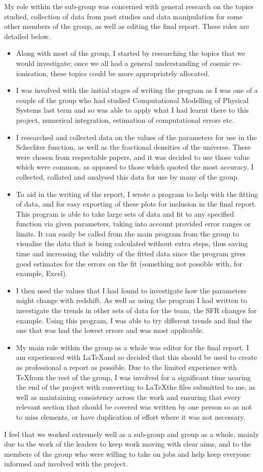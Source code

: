 My role within the sub-group was concerned with general research on the topics studied, collection of data from past studies and data manipulation for some other members of the group, as well as editing the final report. These roles are detailed below.
\begin{itemize}
	\item Along with most of the group, I started by researching the topics that we would investigate; once we all had a general understanding of cosmic re-ionisation, these topics could be more appropriately allocated.
	\item I was involved with the initial stages of writing the program as I was one of a couple of the group who had studied Computational Modelling of Physical Systems last term and so was able to apply what I had learnt there to this project, numerical integration, estimation of computational errors etc.
	\item I researched and collected data on the values of the parameters for use in the Schechter function, as well as the fractional densities of the universe. These were chosen from respectable papers, and it was decided to use those value which were common, as opposed to those which quoted the most accuracy. I collected, collated and analysed this data for use by many of the group.
	\item To aid in the writing of the report, I wrote a program to help with the fitting of data, and for easy exporting of these plots for inclusion in the final report. This program is able to take large sets of data and fit to any specified function via given parameters, taking into account provided error ranges or limits. It can easily be called from the main program from the group to visualise the data that is being calculated without extra steps, thus saving time and increasing the validity of the fitted data since the program gives good estimates for the errors on the fit (something not possible with, for example, Excel).
	\item I then used the values that I had found to investigate how the parameters might change with redshift. As well as using the program I had written to investigate the trends in other sets of data for the team, the SFR changes for example. Using this program, I was able to try different trends and find the one that was had the lowest errors and was most applicable.
	\item My main role within the group as a whole was editor for the final report. I am experienced with \LaTeX and so decided that this should be used to create as professional a report as possible. Due to the limited experience with \TeX from the rest of the group, I was involved for a significant time nearing the end of the project with converting to \LaTeX the files submitted to me, as well as maintaining consistency across the work and ensuring that every relevant section that should be covered was written by one person so as not to miss elements, or have duplication of effort where it was not necessary.
\end{itemize}

I feel that we worked extremely well as a sub-group and group as a whole, mainly due to the work of the leaders to keep work moving with clear aims, and to the members of the group who were willing to take on jobs and help keep everyone informed and involved with the project.
